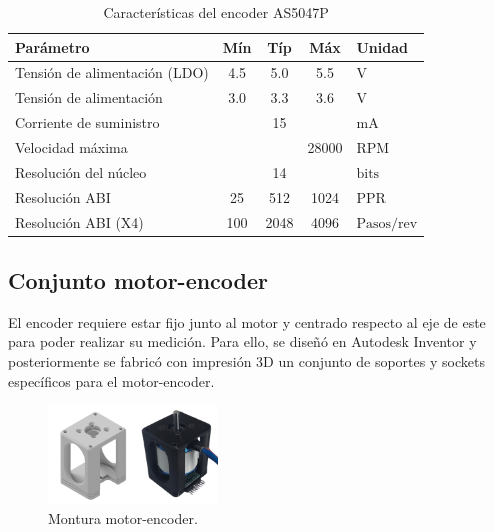 \documentclass[11pt]{report}
\begin{document}
\begin{table}[h!]
	\centering
	\caption{Características del encoder AS5047P}
	\begin{tabular}{l c c c l}
		\hline
		\textbf{Parámetro}            & \textbf{Mín} & \textbf{Típ} & \textbf{Máx} & \textbf{Unidad}      \\
		\hline
		Tensión de alimentación (LDO) & 4.5          & 5.0          & 5.5          & $\mathrm{V}$         \\
		Tensión de alimentación       & 3.0          & 3.3          & 3.6          & $\mathrm{V}$         \\
		Corriente de suministro       &              & 15           &              & $\mathrm{mA}$        \\
		Velocidad máxima              &              &              & 28000        & $\mathrm{RPM}$       \\
		Resolución del núcleo         &              & 14           &              & $\mathrm{bits}$      \\
		Resolución ABI                & 25           & 512          & 1024         & $\mathrm{PPR}$       \\
		Resolución ABI (X4)           & 100          & 2048         & 4096         & $\mathrm{Pasos/rev}$ \\
		\hline
	\end{tabular}
\end{table}
\FloatBarrier

\newpage
\subsection{Conjunto motor-encoder}
El encoder requiere estar fijo junto al motor y centrado respecto al eje de este para poder realizar su medición. Para ello, se diseñó en Autodesk Inventor y posteriormente se fabricó con impresión 3D un conjunto de soportes y sockets específicos para el motor-encoder.

\begin{figure}[ht]
	\centering
	\includegraphics[width=0.4\textwidth]{imagenes/Motor/conjunto.png}
	\caption{Montura motor-encoder.}
	\label{fig:Montura}
\end{figure}
\FloatBarrier
\end{document}

